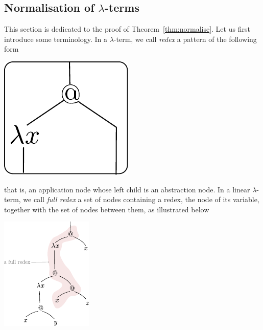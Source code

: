\subsection{Normalisation of $\lambda$-terms}\label{sec:evaluation-lambda}


This section is dedicated to the proof of Theorem~\ref{thm:normalise}. Let us first introduce some terminology. In a $\lambda$-term, we call \emph{redex} a pattern of the following form 
\begin{center}
\includegraphics[scale=.5]{pictures/redex.pdf}
\end{center}
that is, an application node whose left child is an abstraction node. In a linear $\lambda$-term, we call \emph{full redex} a set of nodes  containing a redex, the node of its variable, together with the set of nodes between them, as illustrated below
\begin{center}
\includegraphics[scale=1.5]{pictures/full-redex.pdf}
\end{center}
